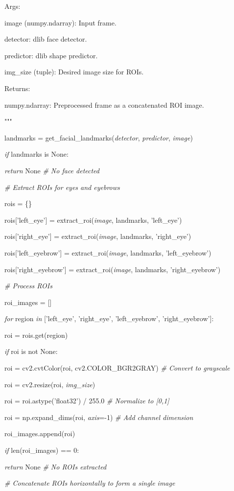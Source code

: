 \documentclass[
]{article}
\begin{document}
Args:

image (numpy.ndarray): Input frame.

detector: dlib face detector.

predictor: dlib shape predictor.

img\_size (tuple): Desired image size for ROIs.

Returns:

numpy.ndarray: Preprocessed frame as a concatenated ROI image.

"""

landmarks = get\_facial\_landmarks(\emph{detector}, \emph{predictor}, \emph{image})

\emph{if} landmarks is None:

\emph{return} None \emph{\# No face detected}

\emph{\# Extract ROIs for eyes and eyebrows}

rois = \{\}

rois{[}'left\_eye'{]} = extract\_roi(\emph{image}, landmarks, 'left\_eye')

rois{[}'right\_eye'{]} = extract\_roi(\emph{image}, landmarks, 'right\_eye')

rois{[}'left\_eyebrow'{]} = extract\_roi(\emph{image}, landmarks, 'left\_eyebrow')

rois{[}'right\_eyebrow'{]} = extract\_roi(\emph{image}, landmarks, 'right\_eyebrow')

\emph{\# Process ROIs}

roi\_images = {[}{]}

\emph{for} region \emph{in} {[}'left\_eye', 'right\_eye', 'left\_eyebrow', 'right\_eyebrow'{]}:

roi = rois.get(region)

\emph{if} roi is not None:

roi = cv2.cvtColor(roi, cv2.COLOR\_BGR2GRAY) \emph{\# Convert to grayscale}

roi = cv2.resize(roi, \emph{img\_size})

roi = roi.astype('float32') / 255.0 \emph{\# Normalize to {[}0,1{]}}

roi = np.expand\_dims(roi, \emph{axis}=-1) \emph{\# Add channel dimension}

roi\_images.append(roi)

\emph{if} len(roi\_images) == 0:

\emph{return} None \emph{\# No ROIs extracted}

\emph{\# Concatenate ROIs horizontally to form a single image}
\end{document}

